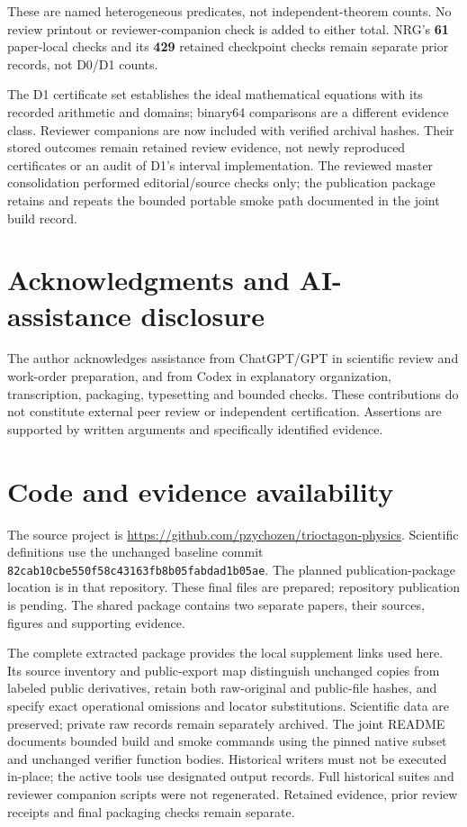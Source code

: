 \documentclass[11pt,a4paper]{article}
\begin{document}
These are named heterogeneous predicates, not independent-theorem counts. No review printout or reviewer-companion check is added to either total. NRG's \textbf{61} paper-local checks and its \textbf{429} retained checkpoint checks remain separate prior records, not D0/\allowbreak{}D1 counts.

The D1 certificate set establishes the ideal mathematical equations with its recorded arithmetic and domains; binary64 comparisons are a different evidence class. Reviewer companions are now included with verified archival hashes. Their stored outcomes remain retained review evidence, not newly reproduced certificates or an audit of D1's interval implementation. The reviewed master consolidation performed editorial/\allowbreak{}source checks only; the publication package retains and repeats the bounded portable smoke path documented in the joint build record.

\section*{Acknowledgments and AI-assistance disclosure}
The author acknowledges assistance from ChatGPT/GPT in scientific review and work-order preparation, and from Codex in explanatory organization, transcription, packaging, typesetting and bounded checks. These contributions do not constitute external peer review or independent certification. Assertions are supported by written arguments and specifically identified evidence.
\clearpage
\section*{Code and evidence availability}
The source project is \url{https://github.com/pzychozen/trioctagon-physics}. Scientific definitions use the unchanged baseline commit \texttt{82cab10cbe550f58c43163fb8b05fabdad1b05ae}.
The planned publication-package location is  in that repository. These final files are prepared; repository publication is pending. The shared package contains two separate papers, their sources, figures and supporting evidence.

The complete extracted package provides the local supplement links used here. Its source inventory and public-export map distinguish unchanged copies from labeled public derivatives, retain both raw-original and public-file hashes, and specify exact operational omissions and locator substitutions. Scientific data are preserved; private raw records remain separately archived.
The joint README documents bounded build and smoke commands using the pinned native subset and unchanged verifier function bodies. Historical writers must not be executed in-place; the active tools use designated output records. Full historical suites and reviewer companion scripts were not regenerated. Retained evidence, prior review receipts and final packaging checks remain separate.
\end{document}

